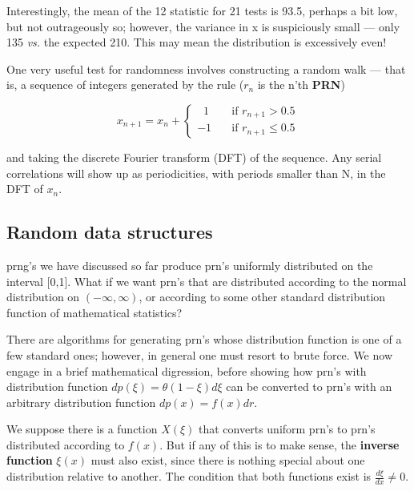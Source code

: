 \begin{verbatim}
\end{verbatim} 
 
Interestingly, the mean of the 12 statistic for 21 tests is 93.5,
perhaps a bit low, but not outrageously so; however, the variance
in x is suspiciously small — only 135 \textit{vs.} the expected 210. This
may mean the distribution is excessively even!

One very useful test for randomness involves constructing a
random walk — that is, a sequence of integers generated by the
rule ($r_n$ is the n'th \textbf{PRN})

\begin{equation}
x_{n+1}=x_n+
\begin{cases}
    \;\; 1 & \quad \text{if } r_{n+1} > 0.5 \\
    -1 & \quad \text{if }  r_{n+1} \leq 0.5
    \end{cases}
\end{equation}

and taking the discrete Fourier transform (DFT) of the sequence.
Any serial correlations will show up as periodicities,
with periods smaller than N, in the DFT of $x_n$.

\subsection{Random data structures}
 prng's we have discussed so far produce prn's uniformly distributed
on the interval [0,1]. What if we want prn's that are
distributed according to the normal distribution on $(-\infty,\infty)$, or
according to some other standard distribution function of mathematical statistics?

There are algorithms for generating prn's whose distribution
function is one of a few standard ones; however, in general one
must resort to brute force. We now engage in a brief mathematical
digression, before showing how prn's with distribution function
$dp(\xi) = \theta(1 - \xi)d\xi$ can be converted to prn's with an arbitrary
distribution function $dp(x) =f(x)dr$.

We suppose there is a function $X(\xi)$ that converts uniform prn's
to prn's distributed according to $f(x)$. But if any of this is to make
sense, the \textbf{inverse function} $\xi(x)$ must also exist, since there is
nothing special about one distribution relative to another. The
condition that both functions exist is $\frac{d\xi}{dx}\neq 0$.

